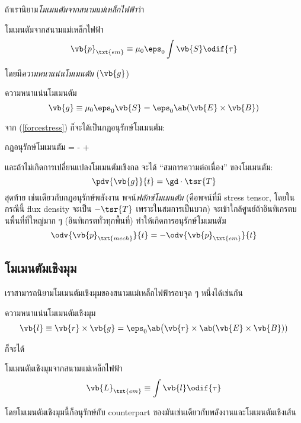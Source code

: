 ถ้าเรานิยาม\emph{โมเมนตัมจากสนามแม่เหล็กไฟฟ้า}ว่า
\begin{defbox}{โมเมนตัมจากสนามแม่เหล็กไฟฟ้า}
    \begin{equation}
        \vb{p}_\txt{em} \equiv \mu_0\eps_0\int \vb{S}\odif{\tau}
    \end{equation}
\end{defbox}
โดยมี\emph{ความหนาแน่นโมเมนตัม} ($\vb{g}$)
\begin{defbox}{ความหนาแน่นโมเมนตัม}
    \begin{equation}
        \vb{g} \equiv \mu_0\eps_0\vb{S} = \eps_0\ab(\vb{E}\times\vb{B})
    \end{equation}
\end{defbox}
จาก (\ref{forcestress}) ก็จะได้เป็นกฎอนุรักษ์โมเมนตัม:
\begin{ieqbox}{กฎอนุรักษ์โมเมนตัม}
     = - + \oint{}\cdot{}
\end{ieqbox}
และถ้าไม่เกิดการเปลี่ยนแปลงโมเมนตัมเชิงกล จะได้ ``สมการความต่อเนื่อง'' ของโมเมนตัม:
\begin{equation}
    \pdv{\vb{g}}{t} = \gd\cdot\tsr{T}
\end{equation}
สุดท้าย เช่นเดียวกับกฎอนุรักษ์พลังงาน พจน์\emph{ฟลักซ์โมเมนตัม} (คือพจน์ที่มี stress tensor, โดยในกรณีนี้ flux density จะเป็น $-\tsr{T}$ เพราะในสมการเป็นบวก) จะเข้าใกล้ศูนย์ถ้าอินทิเกรตบนพื้นที่ที่ใหญ่มาก ๆ (อินทิเกรตทั่วทุกพื้นที่) ทำให้เกิดการอนุรักษ์โมเมนตัม
\begin{equation}
    \odv{\vb{p}_\txt{mech}}{t} = -\odv{\vb{p}_\txt{em}}{t}
\end{equation}

\subsection{โมเมนตัมเชิงมุม}

เราสามารถนิยามโมเมนตัมเชิงมุมของสนามแม่เหล็กไฟฟ้ารอบจุด ๆ หนึ่งได้เช่นกัน
\begin{defbox}{ความหนาแน่นโมเมนตัมเชิงมุม}
    \begin{equation}
        \vb{l} \equiv \vb{r}\times\vb{g} = \eps_0\ab\big(\vb{r}\times\ab(\vb{E}\times\vb{B}))
    \end{equation}
\end{defbox}
ก็จะได้
\begin{defbox}{โมเมนตัมเชิงมุมจากสนามแม่เหล็กไฟฟ้า}
    \begin{equation}
        \vb{L}_\txt{em} \equiv \int\vb{l}\odif{\tau}
    \end{equation}
\end{defbox}
โดยโมเมนตัมเชิงมุมนี้ก็อนุรักษ์กับ counterpart ของมันเช่นเดียวกับพลังงานและโมเมนตัมเชิงเส้น